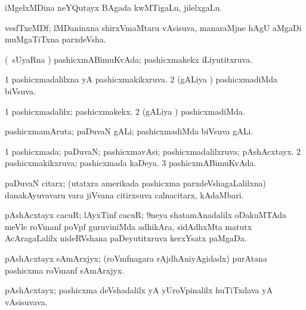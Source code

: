 {{{{{{\bentry
{} 
\gl{\nA}
\expl{}
\bmng
iMgelxMDina neYQutayx BAgada kwMTigaLu, jilelxgaLu. 
\emng
\eentry

\bentry
{} 
\gl{\nA}
\expl{}
\bmng
vesfTxeMDf; lMDaninxna shirxVmaMtaru vAsisuva, manaraMjne hAgU aMgaDi muMgaTiTxna parxdeVsha. 
\emng
\eentry

\bentry
{} 
\gl{\gu}
\expl{}
\bmng
(\kanmu\ sUyaRna \vi) pashicxmABimuKvAda; pashicxmakekx iLiyutitxruva. 
\emng
\eentry

\bentry
{} 
\gl{\gu}
\expl{}
\bmng
\bnum
\num{1} pashicxmadalilxna yA pashicxmakikxruva. 
\num{2} (gALiya \vi) pashicxmadiMda biVsuva. 
\enum
\emng
\eentry

\bentry
{} 
\gl{\kirxvi}
\expl{}
\bmng
\bnum
\num{1} pashicxmadalilx; pashicxmakekx. 
\num{2} (gALiya \vi) pashicxmadiMda. 
\enum
\emng
\eentry

\bentry
{} 
\gl{\nA}
\bmng
pashicxmamAruta; paDuvaN gALi; pashicxmadiMda biVsuva gALi. 
\emng
\eentry

\bentry
{} 
\gl{\gu}
\expl{}
\bmng
\bnum
\num{1} pashicxmada; paDuvaN; pashicxmavAsi; pashicxmadalilxruva; pAshAcxtayx. 
\num{2} pashicxmakikxruva; pashicxmada kaDeya. 
\num{3} pashicxmABimuKvAda. 
\enum
\emng
\eentry

\bentry
{} 
\gl{\nA}
\expl{}
\bmng
paDuvaN citarx; (utatxra amerikada pashicxma parxdeVshagaLalilxna) danakAyuvavaru \mo vara jiVvana citirxsuva calnacitarx, kAdaMbari. 
\emng
\eentry

\bentry
{} 
\gl{\nA}
\expl{}
\bmng
pAshAcxtayx cacuR; lAyxTinf cacuR; $9$neya shatamAnadalilx oDakuMTAda meVle roVmanf poVpf guruviniMda adhikAra, sidAdhxMta matutx AcAragaLalilx nideRVshana paDeyutitxruva kerxYsatx paMgaDa. 
\emng
\eentry

\bentry
{} 
\gl{\nA}
\expl{}
\bmng
pAshAcxtayx sAmArxjyx; (roVmfnagara rAjdhAniyAgidadx) purAtana pashicxma roVmanf sAmArxjyx. 
\emng
\eentry

\bentry
{} 
\gl{\nA}
\expl{}
\bmng
pAshAcxtayx; pashicxma deVshadalilx yA yUroVpinalilx huTiTxdava yA vAsisuvava. 
\emng
\eentry

}}}}}}
